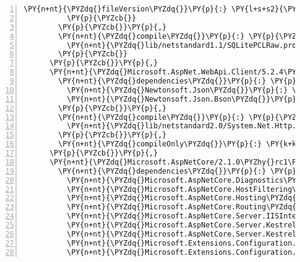 \begin{Verbatim}[commandchars=\\\{\},numbers=left,firstnumber=1,stepnumber=1,numberblanklines=0]
            \PY{n+nt}{\PYZdq{}fileVersion\PYZdq{}}\PY{p}{:} \PY{l+s+s2}{\PYZdq{}1.0.0.0\PYZdq{}}
          \PY{p}{\PYZcb{}}
        \PY{p}{\PYZcb{}}\PY{p}{,}
        \PY{n+nt}{\PYZdq{}compile\PYZdq{}}\PY{p}{:} \PY{p}{\PYZob{}}
          \PY{n+nt}{\PYZdq{}lib/netstandard1.1/SQLitePCLRaw.provider.e\PYZus{}sqlite3.dll\PYZdq{}}\PY{p}{:} \PY{p}{\PYZob{}}\PY{p}{\PYZcb{}}
        \PY{p}{\PYZcb{}}
      \PY{p}{\PYZcb{}}\PY{p}{,}
      \PY{n+nt}{\PYZdq{}Microsoft.AspNet.WebApi.Client/5.2.4\PYZdq{}}\PY{p}{:} \PY{p}{\PYZob{}}
        \PY{n+nt}{\PYZdq{}dependencies\PYZdq{}}\PY{p}{:} \PY{p}{\PYZob{}}
          \PY{n+nt}{\PYZdq{}Newtonsoft.Json\PYZdq{}}\PY{p}{:} \PY{l+s+s2}{\PYZdq{}11.0.2\PYZdq{}}\PY{p}{,}
          \PY{n+nt}{\PYZdq{}Newtonsoft.Json.Bson\PYZdq{}}\PY{p}{:} \PY{l+s+s2}{\PYZdq{}1.0.1\PYZdq{}}
        \PY{p}{\PYZcb{}}\PY{p}{,}
        \PY{n+nt}{\PYZdq{}compile\PYZdq{}}\PY{p}{:} \PY{p}{\PYZob{}}
          \PY{n+nt}{\PYZdq{}lib/netstandard2.0/System.Net.Http.Formatting.dll\PYZdq{}}\PY{p}{:} \PY{p}{\PYZob{}}\PY{p}{\PYZcb{}}
        \PY{p}{\PYZcb{}}\PY{p}{,}
        \PY{n+nt}{\PYZdq{}compileOnly\PYZdq{}}\PY{p}{:} \PY{k+kc}{true}
      \PY{p}{\PYZcb{}}\PY{p}{,}
      \PY{n+nt}{\PYZdq{}Microsoft.AspNetCore/2.1.0\PYZhy{}rc1\PYZhy{}final\PYZdq{}}\PY{p}{:} \PY{p}{\PYZob{}}
        \PY{n+nt}{\PYZdq{}dependencies\PYZdq{}}\PY{p}{:} \PY{p}{\PYZob{}}
          \PY{n+nt}{\PYZdq{}Microsoft.AspNetCore.Diagnostics\PYZdq{}}\PY{p}{:} \PY{l+s+s2}{\PYZdq{}2.1.0\PYZhy{}rc1\PYZhy{}final\PYZdq{}}\PY{p}{,}
          \PY{n+nt}{\PYZdq{}Microsoft.AspNetCore.HostFiltering\PYZdq{}}\PY{p}{:} \PY{l+s+s2}{\PYZdq{}2.1.0\PYZhy{}rc1\PYZhy{}final\PYZdq{}}\PY{p}{,}
          \PY{n+nt}{\PYZdq{}Microsoft.AspNetCore.Hosting\PYZdq{}}\PY{p}{:} \PY{l+s+s2}{\PYZdq{}2.1.0\PYZhy{}rc1\PYZhy{}final\PYZdq{}}\PY{p}{,}
          \PY{n+nt}{\PYZdq{}Microsoft.AspNetCore.Routing\PYZdq{}}\PY{p}{:} \PY{l+s+s2}{\PYZdq{}2.1.0\PYZhy{}rc1\PYZhy{}final\PYZdq{}}\PY{p}{,}
          \PY{n+nt}{\PYZdq{}Microsoft.AspNetCore.Server.IISIntegration\PYZdq{}}\PY{p}{:} \PY{l+s+s2}{\PYZdq{}2.1.0\PYZhy{}rc1\PYZhy{}final\PYZdq{}}\PY{p}{,}
          \PY{n+nt}{\PYZdq{}Microsoft.AspNetCore.Server.Kestrel\PYZdq{}}\PY{p}{:} \PY{l+s+s2}{\PYZdq{}2.1.0\PYZhy{}rc1\PYZhy{}final\PYZdq{}}\PY{p}{,}
          \PY{n+nt}{\PYZdq{}Microsoft.AspNetCore.Server.Kestrel.Https\PYZdq{}}\PY{p}{:} \PY{l+s+s2}{\PYZdq{}2.1.0\PYZhy{}rc1\PYZhy{}final\PYZdq{}}\PY{p}{,}
          \PY{n+nt}{\PYZdq{}Microsoft.Extensions.Configuration.CommandLine\PYZdq{}}\PY{p}{:} \PY{l+s+s2}{\PYZdq{}2.1.0\PYZhy{}rc1\PYZhy{}final\PYZdq{}}\PY{p}{,}
          \PY{n+nt}{\PYZdq{}Microsoft.Extensions.Configuration.EnvironmentVariables\PYZdq{}}\PY{p}{:} \PY{l+s+s2}{\PYZdq{}2.1.0\PYZhy{}rc1\PYZhy{}final\PYZdq{}}\PY{p}{,}

\end{Verbatim}
